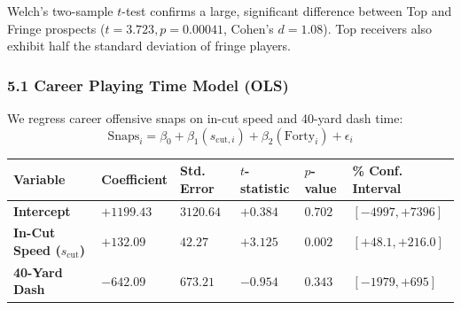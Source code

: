 \documentclass[
  letterpaper,
  DIV=11,
  numbers=noendperiod]{scrartcl}
\newcounter{none} %
\begin{document}
Welch's two-sample \(t\)-test confirms a large, significant difference
between Top and Fringe prospects (\(t = 3.723, p = 0.00041\), Cohen's
\(d = 1.08\)). Top receivers also exhibit half the standard deviation of
fringe players.

\subsubsection{5.1 Career Playing Time Model
(OLS)}\label{career-playing-time-model-ols}

We regress career offensive snaps on in-cut speed and 40-yard dash time:
\[\text{Snaps}_i = \beta_0 + \beta_1 (s_{\text{cut}, i}) + \beta_2 (\text{Forty}_i) + \epsilon_i\]

{\def\LTcaptype{none} %
\begin{longtable}[]{@{}
  >{\raggedright\arraybackslash}p{}
  >{\centering\arraybackslash}p{}
  >{\centering\arraybackslash}p{}
  >{\centering\arraybackslash}p{}
  >{\centering\arraybackslash}p{}
  >{\centering\arraybackslash}p{}@{}}
\toprule\noalign{}
\begin{minipage}[b]{\linewidth}\raggedright
Variable
\end{minipage} & \begin{minipage}[b]{\linewidth}\centering
Coefficient
\end{minipage} & \begin{minipage}[b]{\linewidth}\centering
Std. Error
\end{minipage} & \begin{minipage}[b]{\linewidth}\centering
\(t\)-statistic
\end{minipage} & \begin{minipage}[b]{\linewidth}\centering
\(p\)-value
\end{minipage} & \begin{minipage}[b]{\linewidth}\centering
95\% Conf. Interval
\end{minipage} \\
\midrule\noalign{}
\endhead
\bottomrule\noalign{}
\endlastfoot
\textbf{Intercept} & \(+1199.43\) & \(3120.64\) & \(+0.384\) & \(0.702\)
& \([-4997, +7396]\) \\
\textbf{In-Cut Speed (\(s_{\text{cut}}\))} & \(+132.09\) & \(42.27\) &
\(+3.125\) & \textbf{\(0.002\)} & \([+48.1, +216.0]\) \\
\textbf{40-Yard Dash} & \(-642.09\) & \(673.21\) & \(-0.954\) &
\(0.343\) & \([-1979, +695]\) \\
\end{longtable}
}
\end{document}
